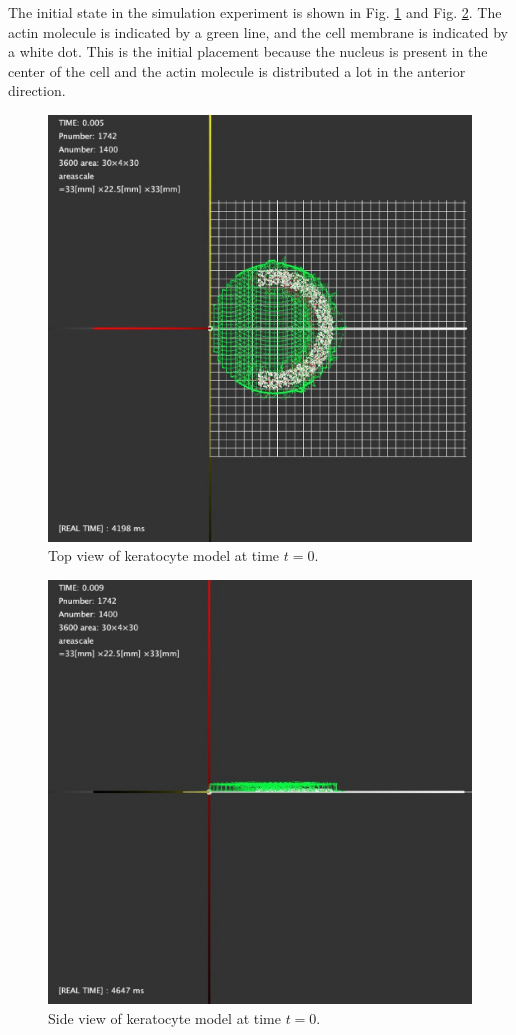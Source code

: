 \documentclass[a4paper,12pt]{book}
\begin{document}
The initial state in the simulation experiment is shown in Fig. \ref{fig:top0} and Fig. \ref{fig:side0}. The actin molecule is indicated by a green line, and the cell membrane is indicated by a white dot. This is the initial placement because the nucleus is present in the center of the cell and the actin molecule is distributed a lot in the anterior direction.
\begin{figure}[tbp]
\centering
\includegraphics[scale=0.25]{top.eps}
\caption{Top view of keratocyte model at time $t=0$.}
\label{fig:top0}
\end{figure}
\begin{figure}[tbp]
\centering
\includegraphics[scale=0.25]{side.eps}
\caption{Side view of keratocyte model at time $t=0$.}
\label{fig:side0}
\end{figure}
\end{document}
